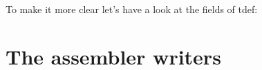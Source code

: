 \documentclass{report}
\begin{document}
To make it more clear let's have a look at the fields of tdef:







\chapter{The assembler writers}
\end{document}
